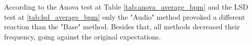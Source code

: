 %
%
%
%
%
%
%
%
%
%
%    
%
%

According to the Anova test at Table \ref{tab:anova_average_bpm} and the LSD test at \ref{tab:lsd_average_bpm} only the "Audio" method provoked a different reaction than the "Base" method. Besides that, all methods decreased their frequency, going against the original expectations.

\FloatBarrier

